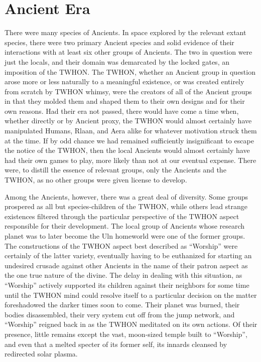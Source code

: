\section{Ancient Era}
There were many species of Ancients. In space explored by the relevant
extant species, there were two primary Ancient species and solid
evidence of their interactions with at least six other groups of
Ancients. The two in question were just the locals, and their domain
was demarcated by the locked gates, an imposition of the TWHON. The
TWHON, whether an Ancient group in question arose more or less
naturally to a meaningful existence, or was created entirely from
scratch by TWHON whimsy, were the creators of all of the Ancient
groups in that they molded them and shaped them to their own designs
and for their own reasons. Had their era not passed, there would have
come a time when, whether directly or by Ancient proxy, the TWHON
would almost certainly have manipulated Humans, Rlaan, and Aera alike
for whatever motivation struck them at the time. If by odd chance we
had remained sufficiently insignificant to escape the notice of the
TWHON, then the local Ancients would almost certainly have had their
own games to play, more likely than not at our eventual expense. There
were, to distill the essence of relevant groups, only the Ancients and
the TWHON, as no other groups were given license to develop.

Among the Ancients, however, there was a great deal of diversity. Some
groups prospered as all but species-children of the TWHON, while
others lead strange existences filtered through the particular
perspective of the TWHON aspect responsible for their development. The
local group of Ancients whose research planet was to later become the
Uln homeworld were one of the former groups. The constructions of the
TWHON aspect best described as ``Worship'' were certainly of the
latter variety, eventually having to be euthanized for starting an
undesired crusade against other Ancients in the name of their patron
aspect as the one true nature of the divine. The delay in dealing with
this situation, as ``Worship'' actively supported its children against
their neighbors for some time until the TWHON mind could resolve
itself to a particular decision on the matter foreshadowed the darker
times soon to come. Their planet was burned, their bodies
disassembled, their very system cut off from the jump network, and
``Worship'' reigned back in as the TWHON meditated on its own
actions. Of their presence, little remains except the vast, moon-sized
temple built to ``Worship'', and even that a melted specter of its
former self, its innards cleansed by redirected solar plasma.

